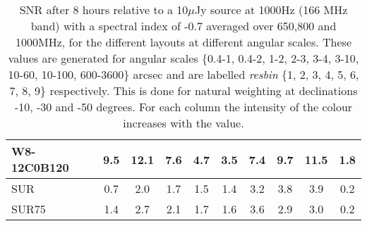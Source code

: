 \begin{table}[!htp]
{{\begin{tabular}{|l|ccccccccc|}
W8-12C0B120 & 9.5 \cellcolor{blue!60.00} & 12.1 \cellcolor{red!60.00} & 7.6 \cellcolor{green!60.00} & 4.7 \cellcolor{orange!60.00} & 3.5 \cellcolor{purple!55.52} & 7.4 \cellcolor{blue!53.77} & 9.7 \cellcolor{red!55.77} & 11.5 \cellcolor{green!57.45} & 1.8 \cellcolor{orange!59.21}\\ \hline 
SUR & 0.7 \cellcolor{blue!18.00} & 2.0 \cellcolor{red!18.00} & 1.7 \cellcolor{green!18.00} & 1.5 \cellcolor{orange!18.00} & 1.4 \cellcolor{purple!18.00} & 3.2 \cellcolor{blue!18.00} & 3.8 \cellcolor{red!22.85} & 3.9 \cellcolor{green!21.94} & 0.2 \cellcolor{orange!18.00}\\ \hline 
SUR75 & 1.4 \cellcolor{blue!21.43} & 2.7 \cellcolor{red!20.59} & 2.1 \cellcolor{green!21.31} & 1.7 \cellcolor{orange!20.22} & 1.6 \cellcolor{purple!21.61} & 3.6 \cellcolor{blue!21.79} & 2.9 \cellcolor{red!18.00} & 3.0 \cellcolor{green!18.00} & 0.2 \cellcolor{orange!18.53}\tabularnewline \hline 
\end{tabular}}\hfill \\

\caption{SNR after 8 hours relative to a 10$\mu$Jy source at 1000Hz (166 MHz band) with a spectral index of -0.7 averaged over 650,800 and 1000MHz, for the different layouts at different angular scales. These values are generated for angular scales \{0.4-1, 0.4-2, 1-2, 2-3, 3-4, 3-10, 10-60, 10-100, 600-3600\} arcsec and are labelled {\it resbin} \{1, 2, 3, 4, 5, 6, 7, 8, 9\} respectively. This is done for natural weighting at declinations -10, -30 and -50 degrees. For each column the intensity of the colour increases with the value.}\label{tab:snravg-new}}
 \end{table}